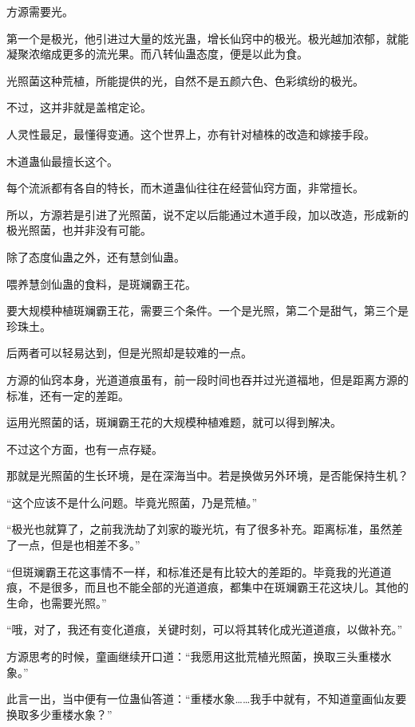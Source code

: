 
\begin{this_body}

方源需要光。

第一个是极光，他引进过大量的炫光蛊，增长仙窍中的极光。极光越加浓郁，就能凝聚浓缩成更多的流光果。而八转仙蛊态度，便是以此为食。

光照菌这种荒植，所能提供的光，自然不是五颜六色、色彩缤纷的极光。

不过，这并非就是盖棺定论。

人灵性最足，最懂得变通。这个世界上，亦有针对植株的改造和嫁接手段。

木道蛊仙最擅长这个。

每个流派都有各自的特长，而木道蛊仙往往在经营仙窍方面，非常擅长。

所以，方源若是引进了光照菌，说不定以后能通过木道手段，加以改造，形成新的极光照菌，也并非没有可能。

除了态度仙蛊之外，还有慧剑仙蛊。

喂养慧剑仙蛊的食料，是斑斓霸王花。

要大规模种植斑斓霸王花，需要三个条件。一个是光照，第二个是甜气，第三个是珍珠土。

后两者可以轻易达到，但是光照却是较难的一点。

方源的仙窍本身，光道道痕虽有，前一段时间也吞并过光道福地，但是距离方源的标准，还有一定的差距。

运用光照菌的话，斑斓霸王花的大规模种植难题，就可以得到解决。

不过这个方面，也有一点存疑。

那就是光照菌的生长环境，是在深海当中。若是换做另外环境，是否能保持生机？

“这个应该不是什么问题。毕竟光照菌，乃是荒植。”

“极光也就算了，之前我洗劫了刘家的璇光坑，有了很多补充。距离标准，虽然差了一点，但是也相差不多。”

“但斑斓霸王花这事情不一样，和标准还是有比较大的差距的。毕竟我的光道道痕，不是很多，而且也不能全部的光道道痕，都集中在斑斓霸王花这块儿。其他的生命，也需要光照。”

“哦，对了，我还有变化道痕，关键时刻，可以将其转化成光道道痕，以做补充。”

方源思考的时候，童画继续开口道：“我愿用这批荒植光照菌，换取三头重楼水象。”

此言一出，当中便有一位蛊仙答道：“重楼水象……我手中就有，不知道童画仙友要换取多少重楼水象？”


\end{this_body}
